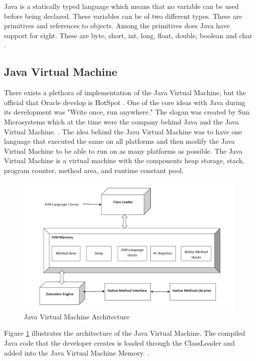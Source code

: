 Java is a statically typed language which means that no variable can be used before being declared. These variables can be of two different types. These are primitives and references to objects. Among the primitives does Java have support for eight. These are byte, short, int, long, float, double, boolean and char \parencite{primjav}.



\subsection{Java Virtual Machine}
There exists a plethora of implementation of the Java Virtual Machine, but the official that Oracle develop is HotSpot \parencite{hotSpot}. One of the core ideas with Java during its development was "Write once, run anywhere." The slogan was created by Sun Microsystems which at the time were the company behind Java and the Java Virtual Machine. \parencite{Craig_2006}. The idea behind the Java Virtual Machine was to have one language that executed the same on all platforms and then modify the Java Virtual Machine to be able to run on as many platforms as possible. The Java Virtual Machine is a virtual machine with the components heap storage, stack, program counter, method area, and runtime constant pool.

\begin{figure}
    \centering
    \includegraphics[width=\textwidth]{images/JvmSpec7.png}
    \caption{Java Virtual Machine Architecture}
    \label{fig:JVM}
\end{figure}

Figure \ref{fig:JVM} illustrates the architecture of the Java Virtual Machine. The compiled Java code that the developer creates is loaded through the ClassLoader and added into the Java Virtual Machine Memory. \parencite{venners_1999}.



